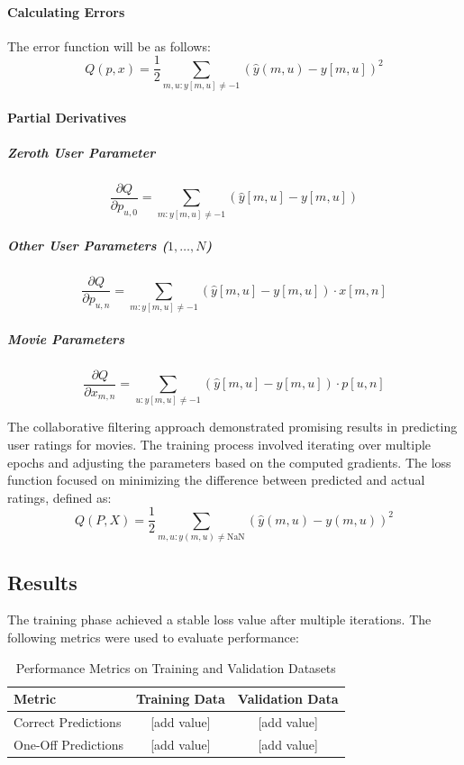 \documentclass[a3paper,12pt]{article}
\begin{document}
\paragraph{Calculating Errors}
The error function will be as follows:
\begin{equation}
Q(p,x) = \frac{1}{2} \sum_{m,u : y[m,u] \neq -1} (\hat{y}(m,u) - y[m,u])^2 \tag{11}
\end{equation}

\paragraph{Partial Derivatives}
\subparagraph{Zeroth User Parameter}
\begin{equation}
\frac{\partial Q}{\partial p_{u,0}} = \sum_{m : y[m,u] \neq -1} (\hat{y}[m,u] - y[m,u]) \tag{12}
\end{equation}

\subparagraph{Other User Parameters (\(1, \ldots, N\))}
\begin{equation}
\frac{\partial Q}{\partial p_{u,n}} = \sum_{m : y[m,u] \neq -1} (\hat{y}[m,u] - y[m,u]) \cdot x[m,n] \tag{13}
\end{equation}

\subparagraph{Movie Parameters}
\begin{equation}
\frac{\partial Q}{\partial x_{m,n}} = \sum_{u : y[m,u] \neq -1} (\hat{y}[m,u] - y[m,u]) \cdot p[u,n] \tag{14}
\end{equation}

The collaborative filtering approach demonstrated promising results in predicting user ratings for movies. The training process involved iterating over multiple epochs and adjusting the parameters based on the computed gradients. The loss function focused on minimizing the difference between predicted and actual ratings, defined as:
\begin{equation}
Q(P, X) = \frac{1}{2} \sum_{m,u : y(m,u) \neq \text{NaN}} \left( \hat{y}(m,u) - y(m,u) \right)^2 \tag{15}
\end{equation}
\subsection{Results}
The training phase achieved a stable loss value after multiple iterations.
The following metrics were used to evaluate performance:

\begin{table}[h]
    \centering
    \begin{tabular}{|l|c|c|}
        \hline
        \textbf{Metric} & \textbf{Training Data} & \textbf{Validation Data} \\ \hline
        Correct Predictions & [add value]         & [add value]           \\ \hline
        One-Off Predictions & [add value]         & [add value]           \\ \hline
    \end{tabular}
    \caption{Performance Metrics on Training and Validation Datasets}
    \label{tab:predictions_metrics}
\end{table}
\end{document}
